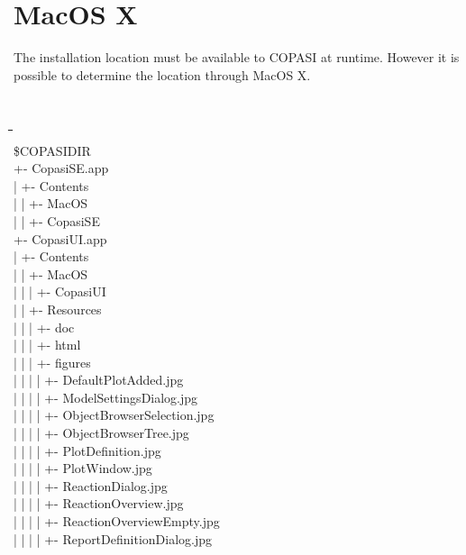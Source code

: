 \documentclass[12pt]{book}
\begin{document}
\section{MacOS X}
The installation location must be available to COPASI at
runtime. However it is possible to determine the location through MacOS
X.
{\tt \scriptsize
\begin{tabbing}
 \hspace{4 pt}\=\hspace{17 pt}\=\hspace{17 pt}\=\hspace{17
 pt}\=\hspace{17 pt}\=\hspace{17 pt}\=\hspace{17 pt}\= \\ [-12 pt]
 \$COPASIDIR \\
 \> +- CopasiSE.app \\
 \> | \> +- Contents \\
 \> | \> | \> +- MacOS \\
 \> | \> | \> \> +- CopasiSE \\
 \> +- CopasiUI.app \\
 \> | \> +- Contents \\
 \> | \> | \> +- MacOS \\
 \> | \> | \> | \> +- CopasiUI \\
 \> | \> | \> +- Resources \\
 \> | \> | \> | \> +- doc \\
 \> | \> | \> | \> \> +- html \\
 \> | \> | \> | \> \> \> +- figures \\
 \> | \> | \> | \> \> \> | \> +- DefaultPlotAdded.jpg \\
 \> | \> | \> | \> \> \> | \> +- ModelSettingsDialog.jpg \\
 \> | \> | \> | \> \> \> | \> +- ObjectBrowserSelection.jpg \\
 \> | \> | \> | \> \> \> | \> +- ObjectBrowserTree.jpg \\
 \> | \> | \> | \> \> \> | \> +- PlotDefinition.jpg \\
 \> | \> | \> | \> \> \> | \> +- PlotWindow.jpg \\
 \> | \> | \> | \> \> \> | \> +- ReactionDialog.jpg \\
 \> | \> | \> | \> \> \> | \> +- ReactionOverview.jpg \\
 \> | \> | \> | \> \> \> | \> +- ReactionOverviewEmpty.jpg \\
 \> | \> | \> | \> \> \> | \> +- ReportDefinitionDialog.jpg \\

\end{tabbing}}
\end{document}
